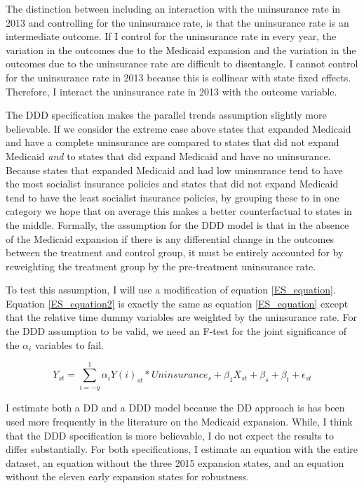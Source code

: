 \documentclass[11pt]{article}
\begin{document}
The distinction between including an interaction with the uninsurance rate in 2013 and controlling for the uninsurance rate, is that the uninsurance rate is an intermediate outcome.  If I control for the uninsurance rate in every year, the variation in the outcomes due to the Medicaid expansion and the variation in the outcomes due to the uninsurance rate are difficult to disentangle.  I cannot control for the uninsurance rate in 2013 because this is collinear with state fixed effects.  Therefore, I interact the uninsurance rate in 2013 with the outcome variable.     

The DDD specification makes the parallel trends assumption slightly more believable.  If we consider the extreme case above states that expanded Medicaid and have a complete uninsurance are compared to states that did not expand Medicaid \textit{and} to states that did expand Medicaid and have no uninsurance.  Because states that expanded Medicaid and had low uninsurance tend to have the most socialist insurance policies and states that did not expand Medicaid tend to have the least socialist insurance policies, by grouping these to in one category we hope that on average this makes a better counterfactual to states in the middle.  Formally, the assumption for the DDD model is that in the absence of the Medicaid expansion if there is any differential change in the outcomes between the treatment and control group, it must be entirely accounted for by reweighting the treatment group by the pre-treatment uninsurance rate.  

To test this assumption, I will use a modification of equation \ref{ES_equation}.  Equation \ref{ES_equation2} is exactly the same as equation \ref{ES_equation} except that the relative time dummy variables are weighted by the uninsurance rate.  For the DDD assumption to be valid, we need an F-test for the joint significance of the $\alpha_i$ variables to fail.


\begin{equation}
    Y_{st}=\sum_{i=-y}^1 \alpha_i Y(i)_{st}*Uninsurance_s+ \beta_{1} X_{st} + \beta_s + \beta_t + \epsilon_{st}
     \label{ES_equation2}
\end{equation}

\cleardoublepage

I estimate both a DD and a DDD model because the DD approach is has been used more frequently in the literature on the Medicaid expansion.  While, I think that the DDD specification is more believable, I do not expect the results to differ substantially.  For both specifications, I estimate an equation with the entire dataset, an equation without the three 2015 expansion states, and an equation without the eleven early expansion states for robustness. 
\end{document}
